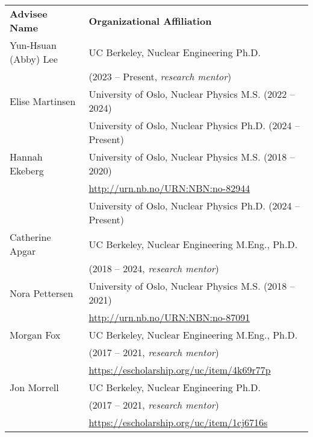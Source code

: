 \begin{longtable}{ @{} l @{\hspace{5ex}} l }
\bf{Advisee Name}   &  \bf{Organizational Affiliation}\\

Yun-Hsuan (Abby) Lee & UC Berkeley, Nuclear Engineering Ph.D. \\ & (2023 -- Present, \textit{research mentor})\\
Elise Martinsen & University of Oslo, Nuclear Physics M.S. (2022 -- 2024)\\
& University of Oslo, Nuclear Physics Ph.D. (2024 -- Present)\\
Hannah Ekeberg & University of Oslo, Nuclear Physics M.S. (2018 -- 2020)\\
& \url{http://urn.nb.no/URN:NBN:no-82944}\vspace{0.5mm}\\
& University of Oslo, Nuclear Physics Ph.D. (2024 -- Present)\\
Catherine  Apgar & UC Berkeley, Nuclear Engineering M.Eng., Ph.D. \\ & (2018 -- 2024, \textit{research mentor})\\
Nora Pettersen & University of Oslo, Nuclear Physics M.S. (2018 -- 2021)\\
               & \url{http://urn.nb.no/URN:NBN:no-87091}\vspace{0.5mm}\\
Morgan  Fox & UC Berkeley, Nuclear Engineering M.Eng., Ph.D. \\ & (2017 -- 2021, \textit{research mentor})\\
                & \url{https://escholarship.org/uc/item/4k69r77p}\vspace{0.5mm}\\               
Jon  Morrell & UC Berkeley, Nuclear Engineering Ph.D. \\ & (2017 -- 2021, \textit{research mentor})\\
                & \url{https://escholarship.org/uc/item/1cj6716s}\vspace{0.5mm}\\


\end{longtable}
